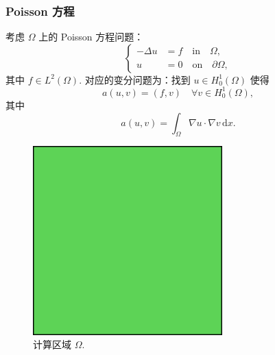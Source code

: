 \documentclass[notheorems,serif]{beamer}
\begin{document}
\begin{frame}\frametitle{Poisson 方程}
\begin{minipage}[b]{0.6\linewidth}
考虑 $\Omega$ 上的 Poisson 方程问题：
$$
\left\{
\begin{aligned}
-\Delta u &= f \quad \text{in} \quad \Omega, \\
u &= 0 \quad \text{on} \quad \partial \Omega,
\end{aligned}
\right.
$$
其中 $f \in L^2(\Omega)$.
对应的变分问题为：找到 $u \in H^1_0(\Omega)$ 使得
$$
a(u, v) = (f, v) \quad \forall v \in H^1_0(\Omega),
$$
其中
$$
a(u, v) = \int_{\Omega} \nabla u \cdot \nabla v \, \mathrm{d} x.
$$
\end{minipage}
\hfill
\begin{minipage}[b]{0.38\linewidth}
    \centering
    \begin{figure}[htpb]
        \centering
        \includegraphics[width=0.65\textwidth]{../figures/domain_quad.pdf}
        \caption{计算区域 $\Omega$.}
    \end{figure}
\end{minipage}

\end{frame}
\end{document}
